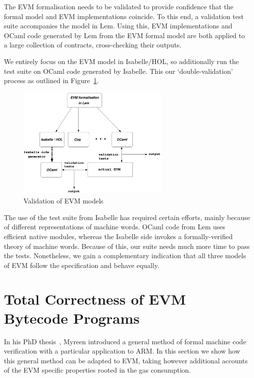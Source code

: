 \documentclass[sigplan,10pt,review]{acmart}\settopmatter{printfolios=true,printccs=false,printacmref=false}
\begin{document}
The EVM formalisation needs to be validated to provide confidence that the formal model
and EVM implementations coincide. To this end, a validation test suite accompanies
the model in Lem. Using this, EVM implementations and OCaml code generated by Lem from the EVM
formal model are both applied to a large collection of contracts, cross-checking their outputs.  

We entirely focus on the EVM model in Isabelle/HOL, so additionally run the test suite 
on OCaml code generated by Isabelle. This our `double-validation' 
process as outlined in Figure~\ref{fig:valid}.          
\begin{figure}[!htbp]
\centering
\includegraphics[height=5.5cm, width=7.5cm]{images/evm_lem}    
        \caption{Validation of EVM models}
\label{fig:valid}
\end{figure}
The use of the test suite from Isabelle has required certain efforts, mainly because 
of different representations of machine words. OCaml code from Lem uses efficient native modules,
whereas the Isabelle side invokes a formally-verified theory of machine words.
Because of this, our suite needs much more time to pass the tests.
Nonetheless, we gain a complementary indication that all three models of EVM follow the specification
and behave equally.    
%
\section{Total Correctness of EVM Bytecode Programs}
\label{sec:corr}
In his PhD thesis~\cite{DBLP:phd/ethos/Myreen09}, Myreen introduced a general 
method of formal 
machine code verification with a particular application to ARM. In this section we show how
this general method can be adapted to EVM, taking however additional accounts of the EVM specific properties rooted in the 
gas consumption.
 
\end{document}
